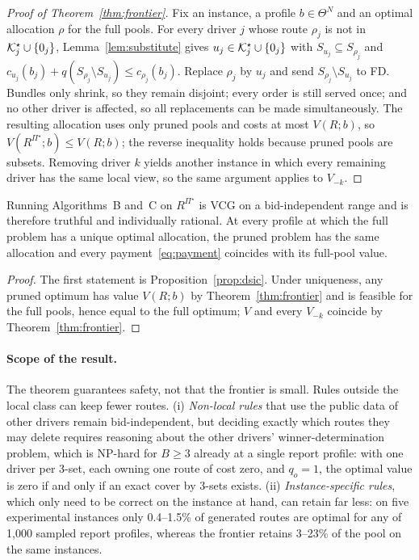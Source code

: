 \begin{proof}[Proof of Theorem~\ref{thm:frontier}]
Fix an instance, a profile $b\in\Theta^N$ and an optimal allocation $\rho$
for the full pools. For every driver $j$ whose route $\rho_j$ is not in
$\mathcal{K}^\star_j\cup\{0_j\}$, Lemma~\ref{lem:substitute} gives
$u_j\in\mathcal{K}^\star_j\cup\{0_j\}$ with $S_{u_j}\subseteq S_{\rho_j}$ and
$c_{u_j}(b_j)+q(S_{\rho_j}\setminus S_{u_j})\le c_{\rho_j}(b_j)$. Replace
$\rho_j$ by $u_j$ and send $S_{\rho_j}\setminus S_{u_j}$ to FD. Bundles only
shrink, so they remain disjoint; every order is still served once; and no
other driver is affected, so all replacements can be made simultaneously.
The resulting allocation uses only pruned pools and costs at most
$V(R;b)$, so $V(R^{\Pi^\star};b)\le V(R;b)$; the reverse inequality holds
because pruned pools are subsets. Removing driver $k$ yields another
instance in which every remaining driver has the same local view, so the
same argument applies to $V_{-k}$.
\end{proof}

\begin{corollary}
\label{cor:vcg}
Running Algorithms~B and~C on $R^{\Pi^\star}$ is VCG on a bid-independent
range and is therefore truthful and individually rational. At every profile
at which the full problem has a unique optimal allocation, the pruned problem
has the same allocation and every payment~\eqref{eq:payment} coincides with
its full-pool value.
\end{corollary}

\begin{proof}
The first statement is Proposition~\ref{prop:dsic}. Under uniqueness, any
pruned optimum has value $V(R;b)$ by Theorem~\ref{thm:frontier} and is
feasible for the full pools, hence equal to the full optimum; $V$ and every
$V_{-k}$ coincide by Theorem~\ref{thm:frontier}.
\end{proof}

\paragraph{Scope of the result.}

\begin{remark}
\label{rem:scope}
The theorem guarantees safety, not that the frontier is small. Rules outside
the local class can keep fewer routes. (i) \emph{Non-local rules} that use
the public data of other drivers remain bid-independent, but deciding
exactly which routes they may delete requires reasoning about the other
drivers' winner-determination problem, which is NP-hard for $B\ge 3$ already
at a single report profile: with one driver per 3-set, each owning one route
of cost zero, and $q_o=1$, the optimal value is zero if and only if an exact
cover by 3-sets exists. (ii) \emph{Instance-specific rules}, which only need
to be correct on the instance at hand, can retain far less: on five
experimental instances only 0.4--1.5\% of generated routes are optimal for
any of 1,000 sampled report profiles, whereas the frontier retains 3--23\% of
the pool on the same instances.
\end{remark}

